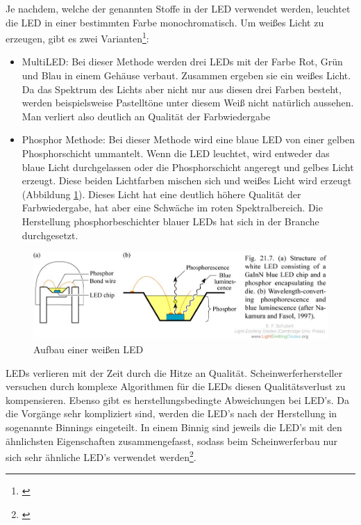 \noindent Je nachdem, welche der genannten Stoffe in der LED verwendet werden, leuchtet die LED in einer bestimmten Farbe monochromatisch. Um weißes Licht zu erzeugen, gibt es zwei Varianten\footnote{\cite[151-152]{mueller}}:

\begin{itemize}
\item MultiLED: Bei dieser Methode werden drei LEDs mit der Farbe Rot, Grün und Blau in einem Gehäuse verbaut. Zusammen ergeben sie ein weißes Licht. Da das Spektrum des Lichts aber nicht nur aus diesen drei Farben besteht, werden beispielsweise Pastelltöne unter diesem Weiß nicht natürlich aussehen. Man verliert also deutlich an Qualität der Farbwiedergabe

\item Phosphor Methode: Bei dieser Methode wird eine blaue LED von einer gelben Phosphorschicht ummantelt. Wenn die LED leuchtet, wird entweder das blaue Licht durchgelassen oder die Phosphorschicht angeregt und gelbes Licht erzeugt. Diese beiden Lichtfarben mischen sich und weißes Licht wird erzeugt (Abbildung \ref{b_ledw}). Dieses Licht hat eine deutlich höhere Qualität der Farbwiedergabe, hat aber eine Schwäche im roten Spektralbereich. Die Herstellung phosphorbeschichter blauer LEDs hat sich in der Branche durchgesetzt.
\end{itemize}

\newpage
\begin{figure}[htp]     %
\centering
\includegraphics[width=1.0\textwidth]{bilder/ledw} 
\caption {Aufbau einer weißen LED\protect\footnotemark}\label{b_ledw}
\end{figure}


\noindent LEDs verlieren mit der Zeit durch die Hitze an Qualität. Scheinwerferhersteller versuchen durch komplexe Algorithmen für die LEDs diesen Qualitätsverlust zu kompensieren. Ebenso gibt es herstellungsbedingte Abweichungen bei LED's. Da die Vorgänge sehr kompliziert sind, werden die LED's nach der Herstellung in sogenannte Binnings eingeteilt. In einem Binnig sind jeweils die LED's mit den ähnlichsten Eigenschaften zusammengefasst, sodass beim Scheinwerferbau nur sich sehr ähnliche LED's verwendet werden\footnote{\cite[153]{mueller}}.

